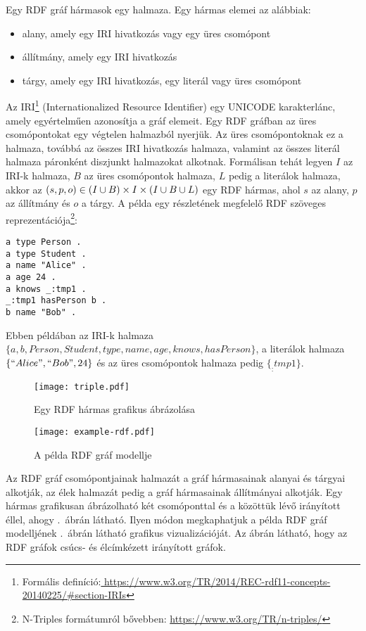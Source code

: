 Egy RDF gráf hármasok egy halmaza. Egy hármas elemei az alábbiak:
\begin{itemize}
	\item alany, amely egy IRI hivatkozás vagy egy üres csomópont
	\item állítmány, amely egy IRI hivatkozás
	\item tárgy, amely egy IRI hivatkozás, egy literál vagy üres csomópont
\end{itemize}
Az IRI\footnote{Formális definíció:\url{ https://www.w3.org/TR/2014/REC-rdf11-concepts-20140225/\#section-IRIs}} (Internationalized Resource Identifier) egy UNICODE karakterlánc, amely egyértelműen azonosítja a gráf elemeit. Egy RDF gráfban az üres csomópontokat egy végtelen halmazból nyerjük. Az üres csomópontoknak ez a halmaza, továbbá az összes IRI hivatkozás halmaza, valamint az összes literál halmaza páronként diszjunkt halmazokat alkotnak. Formálisan tehát legyen $I$ az IRI-k halmaza, $B$ az üres csomópontok halmaza, $L$ pedig a literálok halmaza, akkor az $(s,p,o) \in (I \cup B) \times I \times (I \cup B \cup L)$ egy RDF hármas, ahol $s$ az alany, $p$ az állítmány és $o$ a tárgy. A példa egy részletének megfelelő RDF szöveges reprezentációja\footnote{N-Triples formátumról bővebben: \url{https://www.w3.org/TR/n-triples/}}:
\begin{lstlisting}[frame=single]
a type Person .
a type Student .
a name "Alice" .
a age 24 .
a knows _:tmp1 .
_:tmp1 hasPerson b .
b name "Bob" .
\end{lstlisting}
Ebben példában az IRI-k halmaza $\{a, b, Person, Student, type, name, age, knows, hasPerson\}$, a literálok halmaza $\{``Alice", ``Bob", 24\}$ és az üres csomópontok halmaza pedig $\{_:tmp1\}$.

\begin{figure}[h]
	\centering
	\texttt{[image: triple.pdf]}
	\caption{Egy RDF hármas grafikus ábrázolása}
	\label{fig:triple}
\end{figure}

\begin{figure}
\centering
\texttt{[image: example-rdf.pdf]}
\caption{A példa RDF gráf modellje}
\label{fig:example-rdf}
\end{figure}

Az RDF gráf csomópontjainak halmazát a gráf hármasainak alanyai és tárgyai alkotják, az élek halmazát pedig a gráf hármasainak állítmányai alkotják. Egy hármas grafikusan ábrázolható két csomóponttal és a közöttük lévő irányított éllel, ahogy .~ábrán látható. Ilyen módon megkaphatjuk a példa RDF gráf modelljének .~ábrán látható grafikus vizualizációját. Az ábrán látható, hogy az RDF gráfok csúcs- és élcímkézett irányított gráfok.

